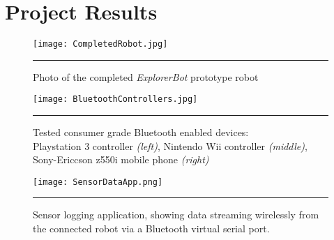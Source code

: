 \chapter{Project Results}
\label{chp:results}


\begin{figure}[tbph]
	\vspace{1em}
	\centering
		\texttt{[image: CompletedRobot.jpg]}
	\rule{35em}{0.5pt}
	\caption[Photo of Completed Robot]{Photo of the completed \textit{ExplorerBot} prototype robot}
	\label{fig:completedrobot}
\end{figure}

\begin{figure}[tbph]
	\vspace{1em}
	\centering
		\texttt{[image: BluetoothControllers.jpg]}
	\rule{35em}{0.5pt}
	\caption[Tested Working Controllers]{Tested consumer grade Bluetooth enabled devices: \\ Playstation 3 controller \textit{(left)}, Nintendo Wii controller \textit{(middle)}, Sony-Ericcson z550i mobile phone \textit{(right)} }
	\label{fig:workingbtcontrollers}
\end{figure}

\begin{figure}[tbph]
	\vspace{1em}
	\centering
		\texttt{[image: SensorDataApp.png]}
	\rule{35em}{0.5pt}
	\caption[Sensor Logging Host Application]{Sensor logging application, showing data streaming wirelessly from the connected robot via a Bluetooth virtual serial port. }
	\label{fig:sensorhostapp}
\end{figure}
